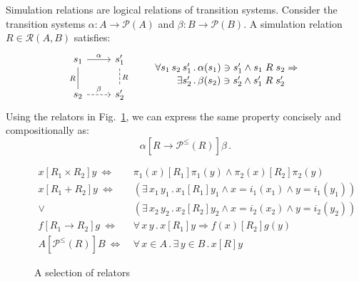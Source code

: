 \documentclass[acmsmall,screen,review,anonymous]{acmart}
\newcommand{\figsize}{\small}
\newcommand{\ifr}[1]{\mathrel{[{#1}]}}
\begin{document}
\begin{example} \label{ex:simrel} %
Simulation relations are
logical relations of transition systems.
Consider the transition systems
$\alpha : A \rightarrow \mathcal{P}(A)$ and
$\beta : B \rightarrow \mathcal{P}(B)$.
A simulation relation $R \in \mathcal{R}(A, B)$
satisfies:
\[
  \begin{tikzcd}[scale=0.8]
    s_1 \arrow[r, "\alpha"]
        \arrow[d, dash, "R"'] &
    s_1' \arrow[d, dashed, dash, "R"] \\
    s_2 \arrow[r, dashed, "\beta"] &
    s_2'
  \end{tikzcd}
  \qquad
  \label{eqn:simrel}
  \begin{array}{r@{\,.\,}l}
    \forall s_1 \, s_2 \, s_1' &
      \alpha(s_1) \ni s_1' \wedge s_1 \mathrel{R} s_2 \Rightarrow
    \\[0.25ex]
    \exists s_2' &
      \beta(s_2) \ni s_2' \wedge s_1' \mathrel{R} s_2'
  \end{array}
\]
Using the relators in Fig.~\ref{fig:relators},
we can express the same property
concisely and compositionally as:
\[
  \alpha \ifr{R \rightarrow \mathcal{P}^\le(R)} \beta \,.
\]
\end{example}

\begin{figure} %
  \figsize
  \begin{align*}
    x \ifr{R_1 \times R_2} y \ \Leftrightarrow\  &
      \pi_1(x) \ifr{R_1} \pi_1(y) \wedge
      \pi_2(x) \ifr{R_2} \pi_2(y) \\
    x \ifr{R_1 + R_2} y \ \Leftrightarrow\  &
      (\exists \, x_1 \, y_1 \,.\,
        x_1 \ifr{R_1} y_1 \wedge
        x = i_1(x_1) \wedge
        y = i_1(y_1)) \\ \vee\ &
      (\exists \, x_2 \, y_2 \,.\,
        x_2 \ifr{R_2} y_2 \wedge
        x = i_2(x_2) \wedge
        y = i_2(y_2)) \\
    f \ifr{R_1 \rightarrow R_2} g \ \Leftrightarrow\  &
      \forall \, x \, y \,.\,
        x \ifr{R_1} y \Rightarrow
        f(x) \ifr{R_2} g(y) \\
    A \ifr{\mathcal{P}^\le(R)} B \ \Leftrightarrow\  &
      \forall \, x \in A \,.\,
      \exists \, y \in B \,.\,
      x \ifr{R} y
  \end{align*}
  \caption{A selection of relators}
  \label{fig:relators}
\end{figure}

\end{document}
